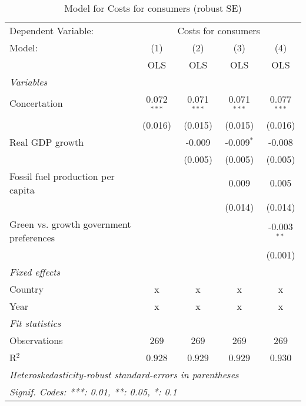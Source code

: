 
\begin{table}[htbp]
   \caption{Model for Costs for consumers (robust SE)}
   \centering
   \begin{tabular}{lcccc}
      \toprule
      Dependent Variable: & \multicolumn{4}{c}{Costs for consumers}\\
      Model:                                  & (1)           & (2)           & (3)           & (4)\\  
                                              &  OLS          & OLS           & OLS           & OLS\\  
      \midrule
      \emph{Variables}\\
      Concertation                            & 0.072$^{***}$ & 0.071$^{***}$ & 0.071$^{***}$ & 0.077$^{***}$\\   
                                              & (0.016)       & (0.015)       & (0.015)       & (0.016)\\   
      Real GDP growth                         &               & -0.009        & -0.009$^{*}$  & -0.008\\   
                                              &               & (0.005)       & (0.005)       & (0.005)\\   
      Fossil fuel production per capita       &               &               & 0.009         & 0.005\\   
                                              &               &               & (0.014)       & (0.014)\\   
      Green vs. growth government preferences &               &               &               & -0.003$^{**}$\\   
                                              &               &               &               & (0.001)\\   
      \emph{Fixed effects}\\
      Country                                 & x             & x             & x             & x\\  
      Year                                    & x             & x             & x             & x\\  
      \midrule \emph{Fit statistics}\\
      Observations                            & 269           & 269           & 269           & 269\\  
      R$^2$                                   & 0.928         & 0.929         & 0.929         & 0.930\\  
      \midrule
      \multicolumn{5}{l}{\emph{Heteroskedasticity-robust standard-errors in parentheses}}\\
      \multicolumn{5}{l}{\emph{Signif. Codes: ***: 0.01, **: 0.05, *: 0.1}}\\
   \end{tabular}
\end{table}


